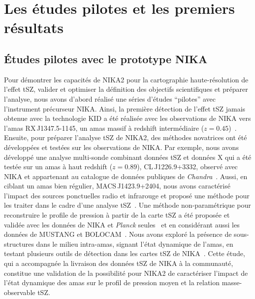 \section{Les études pilotes et les premiers résultats}
\label{se:NIKANIKA2_SZ}

\subsection{\'Etudes pilotes avec le prototype NIKA}
\label{se:NIKA_SZ}

Pour démontrer les capacités de NIKA2 pour la cartographie
haute-résolution de l'effet tSZ, valider et optimiser la définition
des objectifs scientifiques et préparer l'analyse, nous avons d'abord
réalisé une séries d'études ``pilotes'' avec l'instrument précurseur
NIKA. Ainsi, la première détection de l'effet tSZ jamais obtenue avec
la technologie KID a été réalisée avec les observations de NIKA vers
l'amas RX\,J1347.5-1145, un amas massif à redshift intermédiaire
($z = 0.45$)~\citep{Adam2014}. Ensuite, pour préparer l'analyse tSZ de
NIKA2, des méthodes novatrices ont été développées et testées sur les
observations de NIKA. Par exemple, nous avons développé une analyse
multi-sonde combinant données tSZ et données X qui a été testée sur un
amas à haut redshift ($z = 0.89$), CL\,J1226.9+3332, observé avec NIKA
et appartenant au catalogue de données publiques de
\emph{Chandra}~\citep{Adam2015}. Aussi, en ciblant un amas bien régulier,
MACS\,J1423.9+2404, nous avons caractérisé l'impact des sources
ponctuelles radio et infrarouge et proposé une méthode pour les
traiter dans le cadre d'une analyse tSZ~\citep{Adam2016}. Une méthode
non-paramétrique pour reconstruire le profile de pression à partir de
la carte tSZ a été proposée et validée avec les données de NIKA et
\emph{Planck} seules~\citep{Ruppin2017} et en considérant aussi les
données de MUSTANG et BOLOCAM~\citep{Romero2018}. Nous avons exploré
la présence de sous-structures dans le milieu intra-amas, signant
l'état dynamique de l'amas, en testant plusieurs outils de détection
dans les cartes tSZ de NIKA~\citep{Adam2018_sub}. Cette étude, qui a
accompagnée la livraison des données tSZ de NIKA à la communauté,
constitue une validation de la possibilité pour NIKA2 de caractériser
l'impact de l'état dynamique des amas sur le profil de pression moyen
et la relation masse-observable tSZ.

